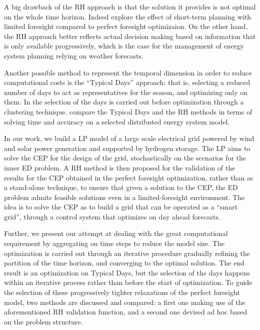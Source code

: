 \documentclass[smallextended,natbib]{svjour3}       %
\numberwithin{theorem}{section}
\begin{document}
A big drawback of the RH approach is that the solution it provides is not optimal on the whole time horizon. 
Indeed \citet{INTRO_short-term} explore the effect of short-term planning with limited foresight compared to perfect foresight optimizaion. 
On the other hand, the RH approach better reflects actual decision making based on information that is only available
 progressively, which is the case for the management of energy system planning relying on weather forecasts.

 Another possible method to represent the temporal dimension in order to reduce computational costs is the ``Typical Days'' approach: 
 that is, selecting a reduced number of days to act as representatives for the season, and optimizing only on them. In \citet{TD_clustering} the selection of the days is carried out before optimization through a clustering technique.
 \citet{RH_vs_TD} compare the Typical Days and the RH methods in terms of solving time and accuracy on a selected distributed energy system model.

In our work, we build a LP model of a large scale electrical grid powered by wind and solar power generation and supported
 by hydrogen storage. 
The LP aims to solve the CEP for the design of the grid, stochastically on the scenarios for the inner ED problem. 
A RH method is then proposed for the validation of the results for the CEP obtained in the perfect foresight optimization, rather than as a 
stand-alone technique, to ensure that given a solution to the CEP, the ED problem admits feasible solutions even in a limited-foresight environment. 
The idea is to solve the CEP as to build a grid that can be operated as a ``smart grid'', through a control system that
 optimizes on day ahead forecasts.

 Further, we present our attempt at dealing with the great computational requirement by aggregating on time steps to reduce the model size. 
 The optimization is carried out through an iterative procedure gradually refining the partition of the time horizon, and converging to the optimal solution. 
 The end result is an optimization on Typical Days, but the selection of the days happens within an iterative process rather than before the start of optimization.
To guide the selection of these progressively tighter relaxations of the perfect foresight model, two methods are discussed and compared:
a first one making use of the aforementioned RH validation function, and a second one devised ad hoc based on the problem structure.
\end{document}
